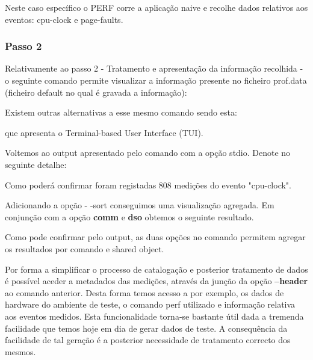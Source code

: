 \documentclass[conference,compsoc]{IEEEtran}
\begin{document}
\begin{itemize}
Neste caso específico o PERF corre a aplicação naive e recolhe dados relativos aos eventos: cpu-clock e page-faults. 


\subsubsection{Passo 2}
\par 
Relativamente ao passo 2 - Tratamento e apresentação da informação recolhida - o seguinte comando permite visualizar a informação presente no ficheiro prof.data (ficheiro default no qual é gravada a informação): \par 



Existem outras alternativas a esse mesmo comando sendo esta:


que apresenta o Terminal-based User Interface (TUI).\par 
 Voltemos ao output apresentado pelo comando com a opção \-\-stdio. Denote no seguinte detalhe:
 

 Como poderá confirmar foram registadas 808 medições do evento "cpu-clock".\par
 Adicionando a opção - -sort  conseguimos uma visualização agregada. Em conjunção com a opção \textbf{comm} e \textbf{dso} obtemos o seguinte resultado.
 

Como pode confirmar pelo output, as duas opções no comando permitem agregar os resultados por comando e shared object.\par 

Por forma a simplificar o processo de catalogação e posterior tratamento de dados é possível aceder a metadados das medições, através da junção da opção \textbf{--header} ao comando anterior.
Desta forma temos acesso a por exemplo, os dados de hardware do ambiente de teste, o comando perf utilizado e informação relativa aos eventos medidos. Esta funcionalidade torna-se bastante útil dada a tremenda facilidade que temos hoje em dia de gerar dados de teste. A consequência da facilidade de tal geração é a posterior necessidade de tratamento correcto dos mesmos.\par 





\end{itemize}
\end{document}

